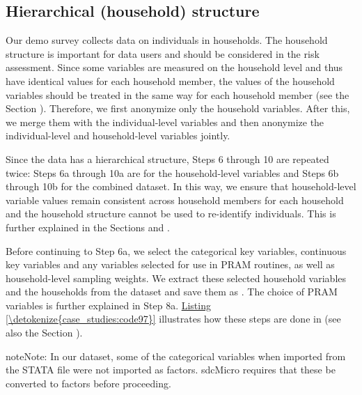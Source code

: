 \documentclass[letterpaper,10pt,english]{sphinxmanual}
\begin{document}
\subsection{Hierarchical (household) structure}
\label{\detokenize{case_studies:hierarchical-household-structure}}
Our demo survey collects data on individuals in households. The
household structure is important for data users and should be considered
in the risk assessment. Since some variables are measured on the
household level and thus have identical values for each household
member, the values of the household variables should be treated in the
same way for each household member (see the Section
).
Therefore, we
first anonymize only the household variables. After this, we merge them
with the individual-level variables and then anonymize the
individual-level and household-level variables jointly.

Since the data has a hierarchical structure, Steps 6 through 10 are
repeated twice: Steps 6a through 10a are for the household-level
variables and Steps 6b through 10b for the combined dataset. In this
way, we ensure that household-level variable values remain consistent
across household members for each household and the household structure
cannot be used to re-identify individuals. This is further explained in
the Sections 
and  .

Before continuing to Step 6a, we select the categorical key variables,
continuous key variables and any variables selected for use in PRAM
routines, as well as household-level sampling weights. We extract these
selected household variables and the households from the dataset and
save them as . The choice of PRAM variables is further explained
in Step 8a. \hyperref[\detokenize{case_studies:code97}]{Listing \ref{\detokenize{case_studies:code97}}} illustrates how these steps are done in  (see
also the Section ).

\begin{sphinxadmonition}{note}{Note:}
In our dataset, some of the categorical variables when imported from the STATA file were not imported as
factors. sdcMicro requires that these be converted to factors before
proceeding.
\end{sphinxadmonition}
\end{document}
